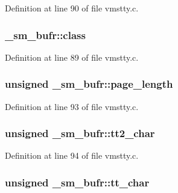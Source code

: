 Definition at line 90 of file vmstty.\+c.

\hypertarget{struct__sm__bufr_a433693b2c5d96b64616f656cebff4868}{
\subsubsection[{class}]{ \+\_\+sm\+\_\+bufr\+::class}}\label{struct__sm__bufr_a433693b2c5d96b64616f656cebff4868}


Definition at line 89 of file vmstty.\+c.

\hypertarget{struct__sm__bufr_a157e75c6193687f1d228d156dee71091}{
\subsubsection[{page\+\_\+length}]{\setlength{\rightskip}{0pt plus 5cm}unsigned \+\_\+sm\+\_\+bufr\+::page\+\_\+length}}\label{struct__sm__bufr_a157e75c6193687f1d228d156dee71091}


Definition at line 93 of file vmstty.\+c.

\hypertarget{struct__sm__bufr_a1647749f7ee214aab54959067adfbd1b}{
\subsubsection[{tt2\+\_\+char}]{\setlength{\rightskip}{0pt plus 5cm}unsigned \+\_\+sm\+\_\+bufr\+::tt2\+\_\+char}}\label{struct__sm__bufr_a1647749f7ee214aab54959067adfbd1b}


Definition at line 94 of file vmstty.\+c.

\hypertarget{struct__sm__bufr_a95c7d0fca83d31354940d6ef4b619f3e}{
\subsubsection[{tt\+\_\+char}]{\setlength{\rightskip}{0pt plus 5cm}unsigned \+\_\+sm\+\_\+bufr\+::tt\+\_\+char}}\label{struct__sm__bufr_a95c7d0fca83d31354940d6ef4b619f3e}


